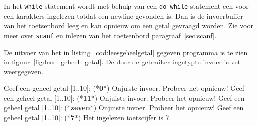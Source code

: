 In het \texttt{while}-statement wordt met behulp van een \texttt{do while}-statement een voor een karakters ingelezen totdat een newline gevonden is. Dan is de invoerbuffer van het toetsenbord leeg en kan opnieuw om een getal gevraagd worden. Zie voor meer over \texttt{scanf} en inlezen van het toetsenbord paragraaf~\ref{sec:scanf}.

De uitvoer van het in listing~\ref{cod:leesgeheelgetal} gegeven programma is te zien in figuur~\ref{fig:lees_geheel_getal}.
De door de gebruiker ingetypte invoer is vet weergegeven. 

\begin{dosbox}[title={Invoer en uitvoer van het programma.},label=fig:lees_geheel_getal]
Geef een geheel getal [1..10]: (*\textbf{0}*)
Onjuiste invoer. Probeer het opnieuw!
Geef een geheel getal [1..10]: (*\textbf{11}*)
Onjuiste invoer. Probeer het opnieuw!
Geef een geheel getal [1..10]: (*\textbf{zeven}*)
Onjuiste invoer. Probeer het opnieuw!
Geef een geheel getal [1..10]: (*\textbf{7}*)
Het ingelezen toetscijfer is 7.
\end{dosbox}



